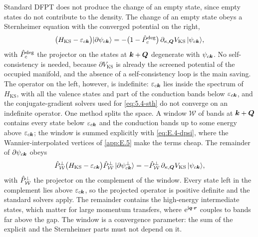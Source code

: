 Standard DFPT does not produce the change of an empty state, since empty states do not contribute to the density. The change of an empty state obeys a Sternheimer equation with the converged potential on the right,
\begin{equation}
  \bigl(H_{\mathrm{KS}} - \varepsilon_{c\bm{k}}\bigr)|\partial\psi_{c\bm{k}}\rangle = -\bigl(1 - \hat{P}^{\mathrm{deg}}_{c}\bigr)\,\partial_{\kappa,\bm{Q}}V_{\mathrm{KS}}\,|\psi_{c\bm{k}}\rangle ,
  \label{eq:E.4-dpsic}
\end{equation}
with $\hat{P}^{\mathrm{deg}}_{c}$ the projector on the states at $\bm{k}+\bm{Q}$ degenerate with $\psi_{c\bm{k}}$. No self-consistency is needed, because $\partial V_{\mathrm{KS}}$ is already the screened potential of the occupied manifold, and the absence of a self-consistency loop is the main saving. The operator on the left, however, is indefinite: $\varepsilon_{c\bm{k}}$ lies inside the spectrum of $H_{\mathrm{KS}}$, with all the valence states and part of the conduction bands below $\varepsilon_{c\bm{k}}$, and the conjugate-gradient solvers used for \cref{eq:5.4-sth} do not converge on an indefinite operator. One method splits the space. A window $\mathcal{W}$ of bands at $\bm{k}+\bm{Q}$ contains every state below $\varepsilon_{c\bm{k}}$ and the conduction bands up to some energy above $\varepsilon_{c\bm{k}}$; the window is summed explicitly with \cref{eq:E.4-dpsi}, where the Wannier-interpolated vertices of \cref{app:E.5} make the terms cheap. The remainder of $\partial\psi_{c\bm{k}}$ obeys
\begin{equation}
  \hat{P}^{\perp}_{\mathcal{W}}\bigl(H_{\mathrm{KS}} - \varepsilon_{c\bm{k}}\bigr)\hat{P}^{\perp}_{\mathcal{W}}\,|\partial\psi^{\perp}_{c\bm{k}}\rangle = -\hat{P}^{\perp}_{\mathcal{W}}\,\partial_{\kappa,\bm{Q}}V_{\mathrm{KS}}\,|\psi_{c\bm{k}}\rangle ,
  \label{eq:E.4-dpsiperp}
\end{equation}
with $\hat{P}^{\perp}_{\mathcal{W}}$ the projector on the complement of the window. Every state left in the complement lies above $\varepsilon_{c\bm{k}}$, so the projected operator is positive definite and the standard solvers apply. The remainder contains the high-energy intermediate states, which matter for large momentum transfers, where $\mathrm{e}^{\mathrm{i}\bm{q}\cdot\bm{r}}$ couples to bands far above the gap. The window is a convergence parameter: the sum of the explicit and the Sternheimer parts must not depend on it.

